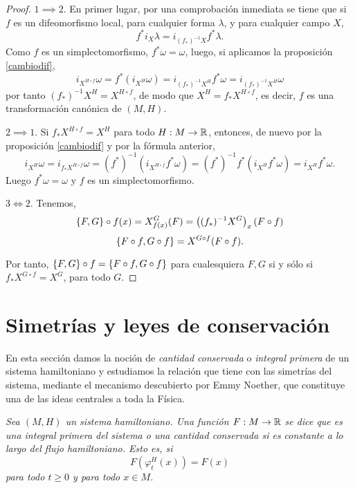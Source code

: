 \begin{proof}

  $1\implies 2$. En primer lugar, por una comprobación inmediata se tiene que si $f$ es un difeomorfismo local, para cualquier forma $\lambda$, y para cualquier campo $X$, 
  \begin{equation*}
    f^*i_X \lambda = i_{(f_*)^{-1}X}f^* \lambda.
  \end{equation*}
  Como $f$ es un simplectomorfismo, $f^*\omega=\omega$, luego, si aplicamos la proposición \ref{cambiodif},
  \begin{equation*}
    i_{X^{H\circ f}}\omega=f^{*}(i_{X^H}\omega)=i_{(f_*)^{-1}X^H}f^*\omega=i_{(f_*)^{-1}X^H}\omega
  \end{equation*}
  por tanto $(f_*)^{-1}X^H=X^{H\circ f}$, de modo que $X^H=f_*X^{H\circ f}$, es decir, $f$ es una transformación canónica de $(M,H)$.

  $2\implies 1$. Si $f_*X^{H\circ f}=X^H$ para todo $H:M \rightarrow \mathbb{R}$, entonces, de nuevo por la proposición \ref{cambiodif} y por la fórmula anterior,
  \begin{equation*}
    i_{X^H}\omega=i_{f_*X^{H\circ f}}\omega = (f^*)^{-1}(i_{X^{H\circ f}}f^*\omega)=(f^*)^{-1}f^*(i_{X^H}f^*\omega)=i_{X^H}f^*\omega.
  \end{equation*}
  Luego $f^* \omega = \omega$ y $f$ es un simplectomorfismo.

  $3\Longleftrightarrow 2$. Tenemos,
  \begin{align*}
    \left\lbrace F,G\right\rbrace\circ f(x)=X^G_{f(x)}(F)=\left( (f_{*})^{-1}X^G \right)_x(F\circ f)
  \end{align*}
  \begin{equation*}
    \left\lbrace F\circ f,G \circ f\right\rbrace = X^{G\circ f}(F \circ f).
  \end{equation*}

  Por tanto, $\left\lbrace F,G\right\rbrace \circ f=\left\lbrace F\circ f,G \circ f\right\rbrace$ para cualesquiera $F,G$ si y sólo si $f_*X^{G \circ f}= X^{G}$, para todo $G$.
\end{proof}

\section{Simetrías y leyes de conservación}
En esta sección damos la noción de \emph{cantidad conservada} o \emph{integral primera} de un sistema hamiltoniano y estudiamos la relación que tiene con las simetrías del sistema, mediante el mecanismo descubierto por Emmy Noether, que constituye una de las ideas centrales a toda la Física.
\begin{defn}
  \em
  Sea $(M,H)$ un sistema hamiltoniano. Una función $F:M \rightarrow \mathbb{R}$ se dice que es una \emph{integral primera} del sistema o una \emph{cantidad conservada} si es constante a lo largo del flujo hamiltoniano. Esto es, si
  \begin{equation*}
    F(\varphi^H_t(x))=F(x)
  \end{equation*}
  para todo $t \geq 0$ y para todo $x \in M$.
\end{defn}

